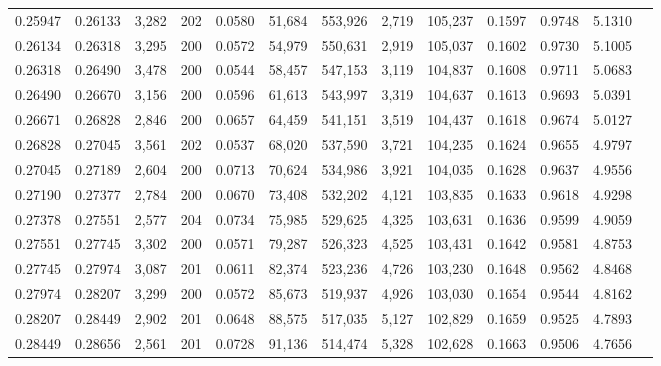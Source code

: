 \begin{tabular}{rrrrrrrrrrrrr}
0.25947 & 0.26133 & 3,282 & 202 &                                     0.0580 &  51,684 & 553,926 &   2,719 & 105,237 & 0.1597 & 0.9748 & 5.1310 \\
0.26134 & 0.26318 & 3,295 & 200 &                                     0.0572 &  54,979 & 550,631 &   2,919 & 105,037 & 0.1602 & 0.9730 & 5.1005 \\
0.26318 & 0.26490 & 3,478 & 200 &                                     0.0544 &  58,457 & 547,153 &   3,119 & 104,837 & 0.1608 & 0.9711 & 5.0683 \\
0.26490 & 0.26670 & 3,156 & 200 &                                     0.0596 &  61,613 & 543,997 &   3,319 & 104,637 & 0.1613 & 0.9693 & 5.0391 \\
0.26671 & 0.26828 & 2,846 & 200 &                                     0.0657 &  64,459 & 541,151 &   3,519 & 104,437 & 0.1618 & 0.9674 & 5.0127 \\
0.26828 & 0.27045 & 3,561 & 202 &                                     0.0537 &  68,020 & 537,590 &   3,721 & 104,235 & 0.1624 & 0.9655 & 4.9797 \\
0.27045 & 0.27189 & 2,604 & 200 &                                     0.0713 &  70,624 & 534,986 &   3,921 & 104,035 & 0.1628 & 0.9637 & 4.9556 \\
0.27190 & 0.27377 & 2,784 & 200 &                                     0.0670 &  73,408 & 532,202 &   4,121 & 103,835 & 0.1633 & 0.9618 & 4.9298 \\
0.27378 & 0.27551 & 2,577 & 204 &                                     0.0734 &  75,985 & 529,625 &   4,325 & 103,631 & 0.1636 & 0.9599 & 4.9059 \\
0.27551 & 0.27745 & 3,302 & 200 &                                     0.0571 &  79,287 & 526,323 &   4,525 & 103,431 & 0.1642 & 0.9581 & 4.8753 \\
0.27745 & 0.27974 & 3,087 & 201 &                                     0.0611 &  82,374 & 523,236 &   4,726 & 103,230 & 0.1648 & 0.9562 & 4.8468 \\
0.27974 & 0.28207 & 3,299 & 200 &                                     0.0572 &  85,673 & 519,937 &   4,926 & 103,030 & 0.1654 & 0.9544 & 4.8162 \\
0.28207 & 0.28449 & 2,902 & 201 &                                     0.0648 &  88,575 & 517,035 &   5,127 & 102,829 & 0.1659 & 0.9525 & 4.7893 \\
0.28449 & 0.28656 & 2,561 & 201 &                                     0.0728 &  91,136 & 514,474 &   5,328 & 102,628 & 0.1663 & 0.9506 & 4.7656 \\

\end{tabular}
